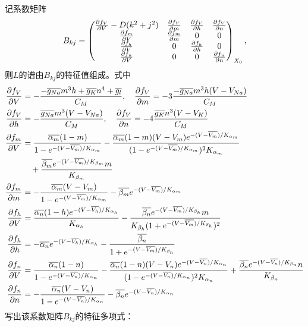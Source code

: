 \documentclass[
pdflinks,
]{xjtuthesis}
\begin{document}
记系数矩阵
\begin{align*}
B _{kj} = \left(
\begin{matrix} 
\pfr{f_V}{V} - D(k^2+j^2) & \pfr{f_V}{m} & \pfr{f_V}{h} & \pfr{f_V}{n}\\ 
\pfr{f_m}{V} & \pfr{f_m}{m} & 0 & 0\\ 
\pfr{f_h}{V} & 0 & \pfr{f_h}{h} & 0 \\
\pfr{f_n}{V} & 0 & 0 & \pfr{f_n}{n}
\end{matrix}
\right) _{X_0},
\end{align*}
则$L$的谱由$B _{kj}$的特征值组成。式中
\begin{align*}
\pfr{f_V}{V} &= -\dfrac{-\gnabar m^3h+\gkbar n^4+\glbar}{C_M}, \quad 
\pfr{f_V}{m} = -3\dfrac{-\gnabar m^3h(V-\vna)}{C_M} \\
\pfr{f_V}{h} &= - \dfrac{\gnabar m^3(V -\vna)}{C_M}, \quad
\pfr{f_V}{n} = -4 \dfrac{\gkbar n^3(V-\vk)}{C_M} \\
\pfr{f_m}{V} &= \dfrac{\ambar (1-m)}{1- e^{-(V-\vmbar)/K_{\am}}} - \dfrac{\ambar (1-m)(V -V_{m})e^{-(V-\vmbar)/K_{\am}}}{(1- e^{-(V-\vmbar)/K_{\am}})^2 K_{\am}} \\
&\quad + \dfrac{\bmbar e^{-(V-\vmbar)/K_{\bm}}m}{K_{\bm}}\\
\pfr{f_m}{m} &= -\dfrac{\ambar (V -V_{m})}{1- e^{-(V-\vmbar)/K_{\am}}}-\bmbar e^{-(V-\vmbar)/K_{\am}}\\
\pfr{f_h}{V} &= \dfrac{\ahbar (1-h)e^{-(V-\vhbar)/K_{\ah}}}{K_{\ah}}-\dfrac{\bhbar e^{-(V-\vmbar)/K_{\bh}}m}{K_{\bh}(1+e^{-(V-\vmbar)/K_{\bh}})^2}\\
\pfr{f_h}{h} &= -\ahbar e^{-(V-\vhbar)/K_{\ah}} - \dfrac{\bhbar }{1+e^{-(V-\vmbar)/K_{\bh}}}\\
\pfr{f_n}{V} &= \dfrac{\anbar (1-n)}{1- e^{-(V-\vnbar)/K_{\an}}} - \dfrac{\anbar (1-n)(V -V_{n})e^{-(V-\vnbar)/K_{\an}}}{(1- e^{-(V-\vnbar)/K_{\an}})^2 K_{\an}} + \dfrac{\bnbar e^{-(V-\vnbar)/K_{\bn}}n}{K_{\bn}}\\
\pfr{f_n}{n} &= -\dfrac{\anbar (V -V_{n})}{1- e^{-(V-\vnbar)/K_{\an}}}-\bnbar e^{-(V-\vnbar)/K_{\an}}
\end{align*}
写出该系数矩阵$B _{kj}$的特征多项式：
\end{document}
